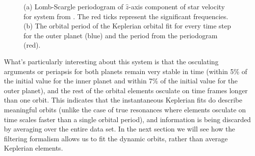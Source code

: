 \begin{figure}[ht]
\centering
{}
 \caption[Two Jupiter system periods]{(a) Lomb-Scargle periodogram of $\hat z$-axis component of star velocity for system from . The red ticks represent the significant frequencies. (b) The orbital period of the Keplerian orbital fit for every time step for the outer planet (blue) and the period from the periodogram (red).}
\end{figure}

What's particularly interesting about this system is that the osculating arguments or periapsis for both planets remain very stable in time (within 5\% of the initial value for the inner planet and within 7\% of the initial value for the outer planet), and the rest of the orbital elements osculate on time frames longer than one orbit.  This indicates that the instantaneous Keplerian fits do describe meaningful orbits (unlike the case of true resonances where elements osculate on time scales faster than a single orbital period), and information is being discarded by averaging over the entire data set.  In the next section we will see how the filtering formalism allows us to fit the dynamic orbits, rather than average Keplerian elements.

